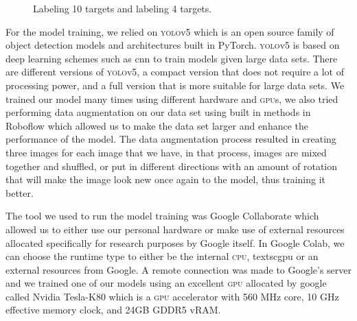\documentclass[../main.tex]{subfiles}
\begin{document}
\begin{figure}[tbp]%
	\centering
	\hspace{0.5cm}
	\caption{%
		\protect{} 
		Labeling 10 targets and
		\protect{} 
		labeling 4 targets.}%
	\label{fig:labeling-targets}%
\end{figure}


For the model training, we relied on \textsc{yolo}v5 which is an open
source family of object detection models and architectures built in 
PyTorch. \textsc{yolo}v5 is based on deep learning schemes such as 
\gls{cnn} to train models given large data sets. There are different
versions of \textsc{yolo}v5, a compact version that does not
require a lot of processing power, and a full version that 
is more suitable for large data sets. We trained our model many times 
using different hardware and \textsc{gpu}s, we also tried performing 
data augmentation on our data set using built in methods in Roboflow 
which allowed us to make the data set larger and enhance the performance 
of the model. The data augmentation process resulted in creating three 
images for each image that we have, in that process, images are mixed
together and shuffled, or put in different directions with an amount of
rotation that will make the image look new once again to the model, 
thus training it better.

The tool we used to run the model training was Google 
Collaborate which allowed us to either use our personal hardware or 
make use of external resources allocated specifically for research 
purposes by Google itself. In Google Colab, we can choose the runtime 
type to either be the internal \textsc{cpu}, textsc{gpu} or an external 
resources from Google. A remote connection was made to Google's server 
and we trained one of our models using an excellent \textsc{gpu} 
allocated by google called Nvidia Tesla-K80 which is a \textsc{gpu} 
accelerator with 560 MHz core, 10 GHz effective memory clock, and 24GB 
GDDR5 vRAM.
\end{document}
